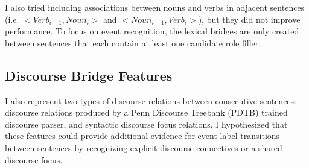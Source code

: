 I also tried including associations between nouns and verbs in
adjacent sentences (i.e. {\it $<Verb_{i-1}, Noun_{i}>$} and {\it $<Noun_{i-1}, Verb_{i}>$}),
 but they did not improve performance.
To focus on event recognition, the lexical bridges are only created
between sentences that each contain at least one candidate role
filler.  


\subsection{Discourse Bridge Features}
\label{disc-bridges}

I also represent two types of discourse relations between consecutive
sentences: discourse relations produced by a Penn Discourse Treebank
(PDTB) trained discourse parser, and syntactic discourse focus
relations.  I hypothesized that these features could provide
additional evidence for event label transitions between sentences by
recognizing explicit discourse connectives or a shared discourse focus.

